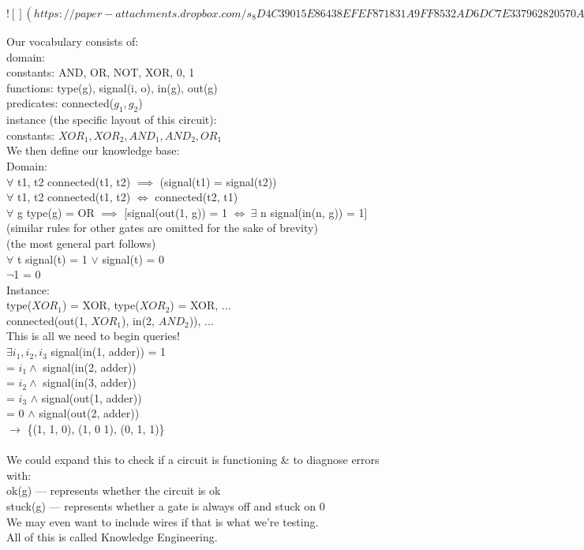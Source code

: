 \documentclass[../../lecture_notes.tex]{subfiles}
\begin{document}
\newpage
$![](https://paper-attachments.dropbox.com/s_8D4C39015E86438EFEF871831A9FF8532AD6DC7E337962820570A542BB06D7AF_1589431034153_Untitled+drawing+21.jpg)$
\newpage

\noindent Our vocabulary consists of:\\
	\indent domain:\\
	\indent \indent constants: {AND, OR, NOT, XOR, 0, 1}\\
	\indent \indent functions: {type(g), signal(i, o), in(g), out(g)}\\
	\indent \indent predicates: {connected($g_1, g_2$)}\\
	\indent instance (the specific layout of this circuit):\\
	\indent \indent constants: {$XOR_1, XOR_2, AND_1, AND_2, OR_1$}\\
We then define our knowledge base:\\
	\indent Domain:\\
	\indent \indent $\forall$ t1, t2 connected(t1, t2) $\implies$ (signal(t1) = signal(t2))\\
	\indent \indent $\forall$ t1, t2 connected(t1, t2) $\iff$ connected(t2, t1)\\
	\indent \indent $\forall$ g type(g) = OR $\implies$ [signal(out(1, g)) = 1 $\iff \ \exists$ n signal(in(n, g)) = 1]\\
	\indent \indent \indent (similar rules for other gates are omitted for the sake of brevity)\\
	\indent \indent (the most general part follows)\\
	\indent \indent $\forall$ t signal(t) = 1 $\lor$ signal(t) = 0\\
	\indent \indent $\neg$1 = 0\\
	\indent Instance:\\
	\indent \indent type($XOR_1$) = XOR, type($XOR_2$) = XOR, ...\\
	\indent \indent connected(out(1, $XOR_1$), in(2, $AND_2$)), ...\\
This is all we need to begin queries!\\
	\indent $\exists i_1, i_2, i_3$ signal(in(1, adder)) = 1\\
		\indent \indent = $i_1 \land$ signal(in(2, adder)) \\
		\indent \indent = $i_2 \land$ signal(in(3, adder)) \\
		\indent \indent = $i_3$ $\land$ signal(out(1, adder)) \\
		\indent \indent = 0 $\land$ signal(out(2, adder)) \\
	\indent $\rightarrow$ \{(1, 1, 0), (1, 0 1), (0, 1, 1)\}\\
\\
We could expand this to check if a circuit is functioning \& to diagnose errors with:\\
	\indent ok(g) — represents whether the circuit is ok\\
	\indent stuck(g) — represents whether a gate is always off and stuck on 0\\
We may even want to include wires if that is what we’re testing.\\
All of this is called Knowledge Engineering.
\end{document}
